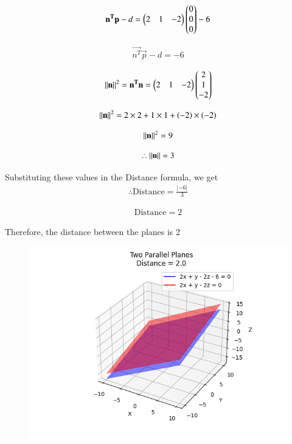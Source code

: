 \documentclass[journal]{IEEEtran}
\begin{document}
\begin{align}
\mathbf{n^T}\mathbf{p} - d = \begin{pmatrix}2 & 1 & -2\end{pmatrix}\begin{pmatrix}0 \\ 0 \\ 0\end{pmatrix} - 6
\end{align}

\begin{align}
\vec{n^T}\vec{p} - d = -6
\end{align}

\begin{align}
\left\lVert\mathbf{n}\right\rVert^2 = \mathbf{n^T}\mathbf{n} = \begin{pmatrix}2 & 1 & -2\end{pmatrix}\begin{pmatrix}2 \\ 1 \\ -2\end{pmatrix}
\end{align}

\begin{align}
\left\lVert\mathbf{n}\right\rVert^2 = 2\times2 + 1\times1 + \left(-2\right)\times\left(-2\right)
\end{align}

\begin{align}
\left\lVert\mathbf{n}\right\rVert^2 = 9
\end{align}

\begin{align}
\therefore \left\lVert\mathbf{n}\right\rVert = 3
\end{align}


Substituting these values in the Distance formula, we get\\
\begin{align}
\therefore \text{Distance} = \frac{|-6|}{3}
\end{align}

\begin{align}
\text{Distance} = 2 
\end{align}

Therefore, the distance between the planes is 2
\begin{figure}[h!]
    \centering
    \includegraphics[height=0.5\textheight, keepaspectratio]{figs/Figure_1.png}
    \label{figure_1}
\end{figure}
\end{document}
